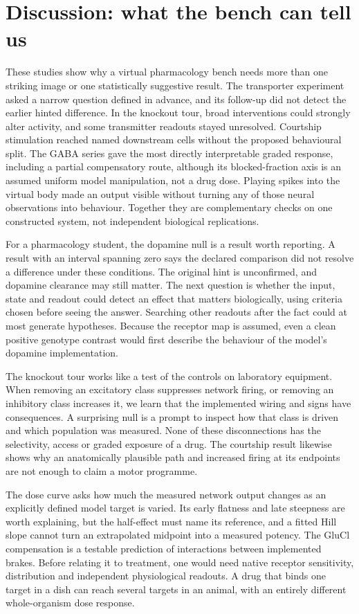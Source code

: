 \documentclass[11pt]{article}
\begin{document}
\section*{Discussion: what the bench can tell us}
These studies show why a virtual pharmacology bench needs more than one striking image or one statistically suggestive result. The transporter experiment asked a narrow question defined in advance, and its follow-up did not detect the earlier hinted difference. In the knockout tour, broad interventions could strongly alter activity, and some transmitter readouts stayed unresolved. Courtship stimulation reached named downstream cells without the proposed behavioural split. The GABA series gave the most directly interpretable graded response, including a partial compensatory route, although its blocked-fraction axis is an assumed uniform model manipulation, not a drug dose. Playing spikes into the virtual body made an output visible without turning any of those neural observations into behaviour. Together they are complementary checks on one constructed system, not independent biological replications.

For a pharmacology student, the dopamine null is a result worth reporting. A result with an interval spanning zero says the declared comparison did not resolve a difference under these conditions. The original hint is unconfirmed, and dopamine clearance may still matter. The next question is whether the input, state and readout could detect an effect that matters biologically, using criteria chosen before seeing the answer. Searching other readouts after the fact could at most generate hypotheses. Because the receptor map is assumed, even a clean positive genotype contrast would first describe the behaviour of the model's dopamine implementation.

The knockout tour works like a test of the controls on laboratory equipment. When removing an excitatory class suppresses network firing, or removing an inhibitory class increases it, we learn that the implemented wiring and signs have consequences. A surprising null is a prompt to inspect how that class is driven and which population was measured. None of these disconnections has the selectivity, access or graded exposure of a drug. The courtship result likewise shows why an anatomically plausible path and increased firing at its endpoints are not enough to claim a motor programme.

The dose curve asks how much the measured network output changes as an explicitly defined model target is varied. Its early flatness and late steepness are worth explaining, but the half-effect must name its reference, and a fitted Hill slope cannot turn an extrapolated midpoint into a measured potency. The GluCl compensation is a testable prediction of interactions between implemented brakes. Before relating it to treatment, one would need native receptor sensitivity, distribution and independent physiological readouts. A drug that binds one target in a dish can reach several targets in an animal, with an entirely different whole-organism dose response.
\end{document}
